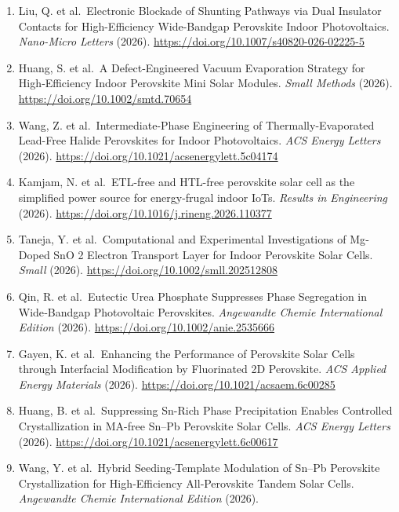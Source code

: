 \documentclass[
  11pt,
]{article}
\begin{document}
\begin{enumerate}
  Xu, H.W. et al.~Efficient Perovskite Solar Modules Enabled by
  Synergistic Interparticle and Interfacial Electrostatic Interaction
  Regulation. \emph{ACS Energy Letters} (2026).
  \url{https://doi.org/10.1021/acsenergylett.6c00476}
\item
  Liu, Q. et al.~Electronic Blockade of Shunting Pathways via Dual
  Insulator Contacts for High-Efficiency Wide-Bandgap Perovskite Indoor
  Photovoltaics. \emph{Nano-Micro Letters} (2026).
  \url{https://doi.org/10.1007/s40820-026-02225-5}
\item
  Huang, S. et al.~A Defect‐Engineered Vacuum Evaporation Strategy for
  High‐Efficiency Indoor Perovskite Mini Solar Modules. \emph{Small
  Methods} (2026). \url{https://doi.org/10.1002/smtd.70654}
\item
  Wang, Z. et al.~Intermediate-Phase Engineering of Thermally-Evaporated
  Lead-Free Halide Perovskites for Indoor Photovoltaics. \emph{ACS
  Energy Letters} (2026).
  \url{https://doi.org/10.1021/acsenergylett.5c04174}
\item
  Kamjam, N. et al.~ETL-free and HTL-free perovskite solar cell as the
  simplified power source for energy-frugal indoor IoTs. \emph{Results
  in Engineering} (2026).
  \url{https://doi.org/10.1016/j.rineng.2026.110377}
\item
  Taneja, Y. et al.~Computational and Experimental Investigations of
  Mg‐Doped SnO 2 Electron Transport Layer for Indoor Perovskite Solar
  Cells. \emph{Small} (2026).
  \url{https://doi.org/10.1002/smll.202512808}
\item
  Qin, R. et al.~Eutectic Urea Phosphate Suppresses Phase Segregation in
  Wide‐Bandgap Photovoltaic Perovskites. \emph{Angewandte Chemie
  International Edition} (2026).
  \url{https://doi.org/10.1002/anie.2535666}
\item
  Gayen, K. et al.~Enhancing the Performance of Perovskite Solar Cells
  through Interfacial Modification by Fluorinated 2D Perovskite.
  \emph{ACS Applied Energy Materials} (2026).
  \url{https://doi.org/10.1021/acsaem.6c00285}
\item
  Huang, B. et al.~Suppressing Sn-Rich Phase Precipitation Enables
  Controlled Crystallization in MA-free Sn--Pb Perovskite Solar Cells.
  \emph{ACS Energy Letters} (2026).
  \url{https://doi.org/10.1021/acsenergylett.6c00617}
\item
  Wang, Y. et al.~Hybrid Seeding‐Template Modulation of Sn--Pb
  Perovskite Crystallization for High‐Efficiency All‐Perovskite Tandem
  Solar Cells. \emph{Angewandte Chemie International Edition} (2026).

\end{enumerate}
\end{document}
